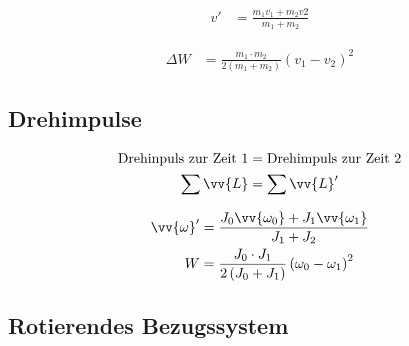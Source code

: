 \begin{boxleft}
\end{boxleft}\begin{boxrightshaded}
\begin{align*}
v'		&=\frac{m_1v_1+m_2v2}{m_1+m_2}
\end{align*}
\end{boxrightshaded}

\begin{boxleft}
\end{boxleft}\begin{boxrightshaded}
\begin{align*}
\Delta W	&=\frac{m_1\cdot m_2}{2\left(m_1+m_2\right)}\left(v_1-v_2\right)^2
\end{align*}
\end{boxrightshaded}
\subsection{Drehimpulse}

\begin{boxleft}
\end{boxleft}\begin{boxrightshaded}
\begin{align*}
\text{Drehinpuls zur Zeit 1} &= \text{Drehimpuls zur Zeit 2}\\
\sum \vv{L}&=\sum \vv{L}'
\end{align*}
\end{boxrightshaded}

\begin{boxleft}
\end{boxleft}\begin{boxrightshaded}
\begin{align*}
\vv{\omega}'&=\frac{J_0\vv{\omega_0}+J_1\vv{\omega_1}}{J_1+J_2}\\
W&=\frac{J_0\cdot J_1}{2\left(J_0+J_1\right)}\left(\omega_0-\omega_1\right)^2
\end{align*}
\end{boxrightshaded}


\subsection{Rotierendes Bezugssystem}

